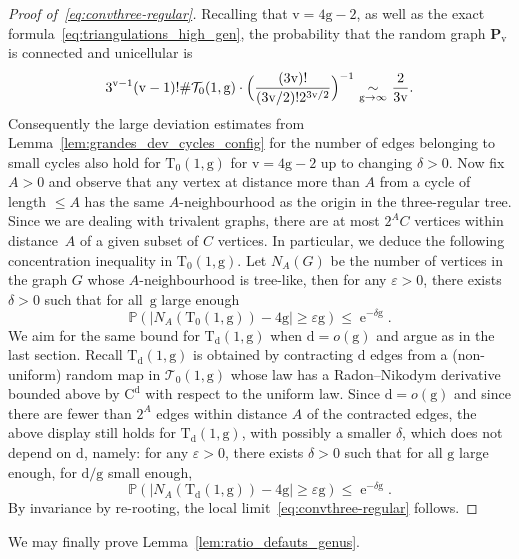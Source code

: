 \documentclass[JEP,XML,SOM,Unicode,NoFloatCountersInSection,NoEqCountersInSection]{cedram}
\theoremstyle{plain}
\theoremstyle{definition}
\theoremstyle{remark}
\renewcommand{\P}{\mathbb{P}}
\newcommand{\e}{\operatorname{e}}
\newcommand{\Triv}{\mathrm{T}}
\newcommand{\defect}{\mathrm{d}}
\newcommand{\gen}{\mathrm{g}}
\newcommand{\ver}{\mathrm{v}}
\newcommand{\equi}[1][n]{\,\mathop{\sim}^{}_{#1 \to \infty}\,}
\begin{document}
\begin{proof}[Proof of~\eqref{eq:convthree-regular}]
Recalling that $\ver=4\gen-2$, as well as the exact formula~\eqref{eq:triangulations_high_gen}, the probability that the random graph $\mathbf{P}_{\ver}$ is connected and unicellular is
\[
{3^{\ver-1} (\ver-1)! \#\mathcal{T}_{0}(1,\gen)} \cdot \Bigl({ \frac{(3\ver)!}{(3\ver/2)! 2^{3\ver/2}}} \Bigr)^{-1}
\equi[\gen] \frac{2}{3\ver}.
\]
Consequently the large deviation estimates from Lemma~\ref{lem:grandes_dev_cycles_config} for the number of edges belonging to small cycles also hold for $ \Triv_{0}(1, \gen)$ for $\ver = 4 \gen-2$ up to changing $\delta >0$.
Now fix $A>0$ and observe that any vertex at distance more than $ A$ from a cycle of length $ \leq A$ has the same $A$-neighbourhood as the origin in the three-regular tree. Since we are dealing with trivalent graphs, there are at most $ 2^{A}C$ vertices within distance~$A$ of a given subset of $C$ vertices. In particular, we deduce the following concentration inequality in $ \Triv_{ 0}(1, \gen)$. Let $ N_{A}(G)$ be the number of vertices in the graph $G$ whose $A$-neighbourhood is tree-like, then for any $\varepsilon>0$, there exists $\delta >0$ such that for all~$\gen$ large enough
\[
\P(|N_{A}(\Triv_{ 0}(1, \gen)) - 4\gen| \geq \varepsilon \gen) \leq \e^{-\delta \gen}.
\]
We aim for the same bound for $\Triv_{\defect}(1, \gen)$ when $ \defect = o(\gen)$ and argue as in the last section. Recall $ \Triv_{ \defect}(1, \gen)$ is obtained by contracting $ \defect$ edges from a (non-uniform) random map in $\mathcal{T}_0(1, \gen)$ whose law has a Radon--Nikodym derivative bounded above by $\mathrm{C}^{ \defect}$ with respect to the uniform law. Since $ \defect = o(\gen)$ and since there are fewer than $2^{A}$ edges within distance $A$ of the contracted edges, the above display still holds for $ \Triv_{ \defect}(1, \gen)$, with possibly a smaller $\delta$, which does not depend on $\defect$, namely: for any $\varepsilon>0$, there exists $\delta >0$ such that for all $\gen$ large enough, for $\defect/\gen$ small enough,
\begin{equation}\label{eq:grandes_dev_high_gen}
\P(|N_{A}(\Triv_{\defect}(1, \gen)) - 4\gen| \geq \varepsilon \gen) \leq \e^{-\delta \gen}.
\end{equation}
By invariance by re-rooting, the local limit~\eqref{eq:convthree-regular} follows.
\end{proof}

We may finally prove Lemma~\ref{lem:ratio_defauts_genus}.
\end{document}
